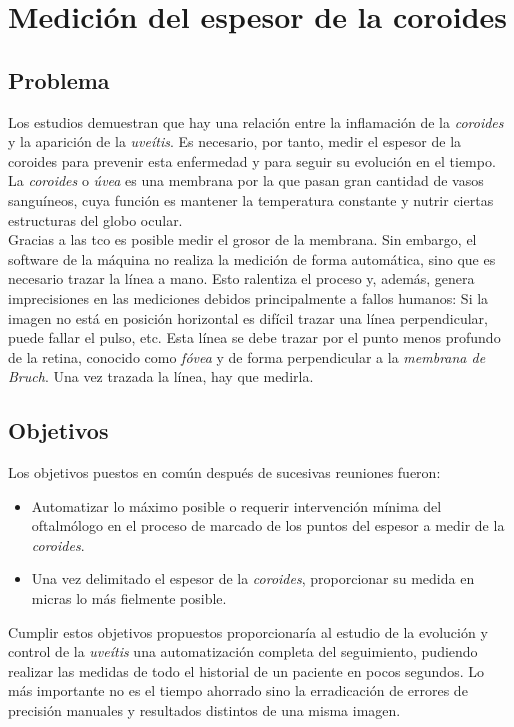 \chapter{Medición del espesor de la coroides}
\section{Problema}
Los estudios demuestran que hay una relación entre la inflamación de
la \emph{coroides} y la aparición de la \emph{uveítis}. Es necesario,
por tanto, medir el espesor de la coroides para prevenir esta
enfermedad y para seguir su evolución en el tiempo.\\
La \emph{coroides} o \emph{úvea} es una membrana por la que pasan gran
cantidad de vasos sanguíneos, cuya función es mantener la temperatura
constante y nutrir ciertas estructuras del globo ocular. \\
Gracias a las \gls{tco} es posible medir el grosor de la
membrana. Sin embargo, el software de la máquina no realiza la
medición de forma automática, sino que es necesario trazar la línea a
mano. Esto ralentiza el proceso y, además, genera imprecisiones en las
mediciones debidos principalmente a fallos humanos: Si la imagen no
está en posición horizontal es difícil trazar una línea perpendicular,
puede fallar el pulso, etc. Esta línea se debe trazar por el punto
menos profundo de la retina, conocido como \emph{fóvea} y de forma
perpendicular a la \emph{membrana de Bruch}. Una vez trazada la línea,
hay que medirla.


\section{Objetivos}
Los objetivos puestos en común después de sucesivas reuniones fueron:
\begin{itemize}
\item Automatizar lo máximo posible o requerir intervención mínima del
  oftalmólogo en el proceso de marcado de los puntos del espesor a medir de la
  \emph{coroides}.
\item Una vez delimitado el espesor de la \emph{coroides},
  proporcionar su medida en micras lo más fielmente posible.
\end{itemize}
Cumplir estos objetivos propuestos proporcionaría al estudio de la
evolución y control de la \emph{uveítis} una automatización completa
del seguimiento, pudiendo realizar las medidas de todo el historial de
un paciente en pocos segundos. Lo más importante no es el tiempo
ahorrado sino la erradicación de errores de precisión manuales y
resultados distintos de una misma imagen.

